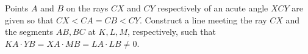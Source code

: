 Points $A$ and $B$ on the rays $CX$ and $CY$ respectively of an acute angle $XCY$ are given so that $CX < CA = CB < CY$. Construct a line meeting the ray $CX$ and the segments $AB,BC$ at $K,L,M$, respectively, such that $KA \cdot YB = XA \cdot MB = LA\cdot LB \ne 0$.
